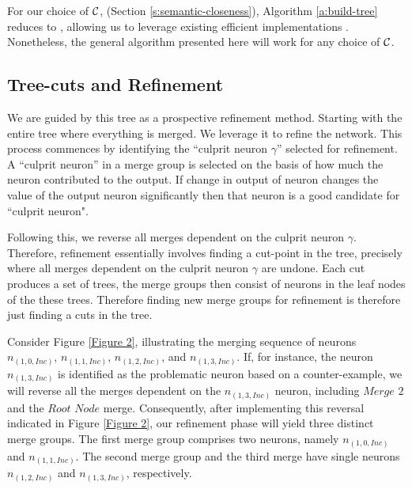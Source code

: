 For our choice of $\mathcal{C}$, (Section \ref{s:semantic-closeness}), Algorithm
\ref{a:build-tree} reduces to \hcluster, allowing us to leverage existing
efficient implementations \cite{scipy-hcluster-linkage}. Nonetheless, the
general algorithm presented here will work for any choice of $\mathcal{C}$.

\subsection{Tree-cuts and Refinement}
\label{s:refinement}




We are guided by this tree as a prospective refinement method. Starting with the 
entire tree where everything is merged. We leverage it to refine the network.
This process commences by identifying the ``culprit neuron $\gamma$'' 
selected for refinement. A ``culprit neuron'' in a merge group is selected 
on the basis of how much the neuron contributed to the output. If change in 
output of  neuron changes the value of the output neuron significantly then
that neuron is a good candidate for ``culprit neuron". 

Following this, we reverse all merges dependent on the culprit 
neuron $\gamma$. Therefore, refinement essentially involves finding a 
cut-point in the tree, precisely where all merges dependent on the 
culprit neuron $\gamma$ are undone. Each cut produces a set of trees, 
the merge groups then consist of neurons in the leaf nodes of the  these trees.
Therefore finding new merge groups for refinement is therefore just finding a 
cuts in the tree.


Consider Figure \ref{Figure 2}, illustrating the merging sequence of 
neurons $n_{(1,0,Inc)}$, $n_{(1,1,Inc)}$, $n_{(1,2,Inc)}$, and 
$n_{(1, 3, Inc)}$. If, for instance, the neuron $n_{(1,3,Inc)}$ 
is identified as the problematic neuron based on a counter-example, 
we will reverse all the merges dependent on the $n_{(1,3,Inc)}$ neuron,
 including $\textit{Merge 2}$ and the $\textit{Root Node}$ merge. 
 Consequently, after implementing this reversal indicated in Figure 
 \ref{Figure 2}, our refinement phase will yield three distinct merge groups. 
 The first merge group comprises two neurons, namely $n_{(1,0,Inc)}$ and
 $n_{(1,1, Inc)}$. The second merge group and the third merge have single 
 neurons $n_{(1,2, Inc)}$ and $n_{(1,3,Inc)}$, respectively.

